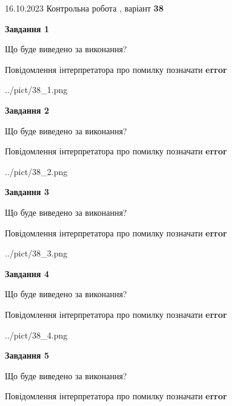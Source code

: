 \documentclass[12pt, ukrainian]{article}
\begin{document}
{\Large{16.10.2023 Контрольна робота , варіант  \No \textbf { 38 }\par}}
{
\begin {large}
{\begin {center}\textbf{Завдання 1}\end {center}}\par
Що буде виведено за виконання? \par
Повідомлення інтерпретатора про помилку позначати \textbf{error}

\begin{center}
	{../pict/38_1.png}
\end{center}
\newpage

{\begin {center}\textbf{Завдання 2}\end {center}}\par
Що буде виведено за виконання? \par
Повідомлення інтерпретатора про помилку позначати \textbf{error}

\begin{center}
	{../pict/38_2.png}
\end{center}
\newpage

{\begin {center}\textbf{Завдання 3}\end {center}}\par
Що буде виведено за виконання? \par
Повідомлення інтерпретатора про помилку позначати \textbf{error}

\begin{center}
	{../pict/38_3.png}
\end{center}
\newpage

{\begin {center}\textbf{Завдання 4}\end {center}}\par
Що буде виведено за виконання? \par
Повідомлення інтерпретатора про помилку позначати \textbf{error}

\begin{center}
	{../pict/38_4.png}
\end{center}
\newpage

{\begin {center}\textbf{Завдання 5}\end {center}}\par
Що буде виведено за виконання? \par
Повідомлення інтерпретатора про помилку позначати \textbf{error}


\end{large}}
\end{document}
